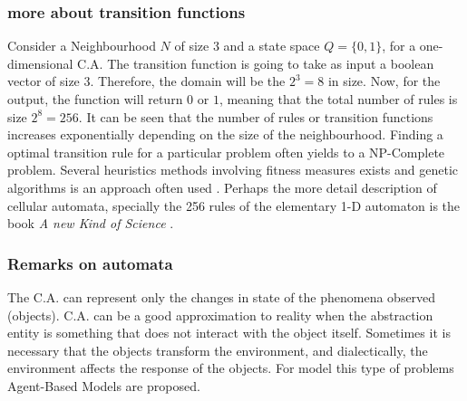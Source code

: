 \documentclass[fleqn,10pt]{SelfArx} %
\begin{document}
\subsubsection{more about transition functions}
Consider a Neighbourhood $N$ of size 3 and a state space $Q = \{0,1\}$, for a one-dimensional C.A. The transition function is going to take as input a boolean vector of size 3. Therefore, the domain will be the $2^3 = 8$ in size. Now, for the output, the function will return $0$ or $1$, meaning that the total number of rules is size $2^8 = 256$. It can be seen that the number of rules or transition functions increases exponentially depending on the size of the neighbourhood. Finding a optimal transition rule for a particular problem often yields to a NP-Complete problem. Several heuristics methods involving fitness measures exists and genetic algorithms is an approach often used \citep{mitchell_ga}. Perhaps the more detail description of cellular automata, specially the 256 rules of the elementary 1-D automaton is the book {\em A new Kind of Science} \citet{wolfram02}.
\subsubsection{Remarks on automata}
The C.A. can represent only the changes in state of the phenomena observed (objects). C.A. can be a good approximation to reality when the abstraction entity is something that does not interact with the object itself. Sometimes it is necessary that the objects transform the environment, and dialectically, the environment affects the response of the objects. For model this type of problems Agent-Based Models are proposed.
\end{document}
